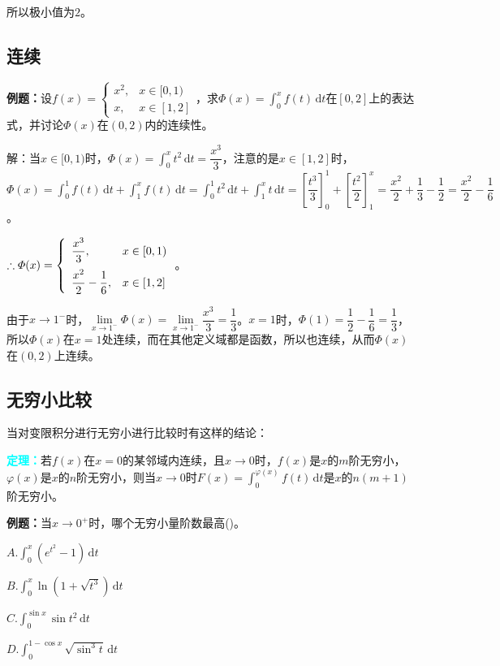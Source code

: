 \documentclass[UTF8, 12pt]{ctexart}
\begin{document}
所以极小值为$2$。

\subsection{连续}

\textbf{例题：}设$f(x)=\left\{\begin{array}{ll}
    x^2, & x\in[0,1) \\
    x, & x\in[1,2]
\end{array}\right.$，求$\varPhi(x)=\int_0^xf(t)\,\textrm{d}t$在$[0,2]$上的表达式，并讨论$\varPhi(x)$在$(0,2)$内的连续性。

解：当$x\in[0,1)$时，$\varPhi(x)=\int_0^xt^2\,\textrm{d}t=\dfrac{x^3}{3}$，注意的是$x\in[1,2]$时，$\varPhi(x)=\int_0^1f(t)\,\textrm{d}t+\int_1^xf(t)\,\textrm{d}t=\int_0^1t^2\,\textrm{d}t+\int_1^xt\,\textrm{d}t=\left[\dfrac{t^3}{3}\right]_0^1+\left[\dfrac{t^2}{2}\right]_1^x=\dfrac{x^2}{2}+\dfrac{1}{3}-\dfrac{1}{2}=\dfrac{x^2}{2}-\dfrac{1}{6}$。

$\therefore\varPhi(x)=\left\{\begin{array}{ll}
    \dfrac{x^3}{3}, & x\in[0,1) \medskip \\
    \dfrac{x^2}{2}-\dfrac{1}{6}, & x\in[1,2]
\end{array}\right.$。

由于$x\to1^-$时，$\lim\limits_{x\to1^-}\varPhi(x)=\lim\limits_{x\to1^-}\dfrac{x^3}{3}=\dfrac{1}{3}$。$x=1$时，$\varPhi(1)=\dfrac{1}{2}-\dfrac{1}{6}=\dfrac{1}{3}$，所以$\varPhi(x)$在$x=1$处连续，而在其他定义域都是函数，所以也连续，从而$\varPhi(x)$在$(0,2)$上连续。

\subsection{无穷小比较}

当对变限积分进行无穷小进行比较时有这样的结论：

\textcolor{aqua}{\textbf{定理：}}若$f(x)$在$x=0$的某邻域内连续，且$x\to0$时，$f(x)$是$x$的$m$阶无穷小，$\varphi(x)$是$x$的$n$阶无穷小，则当$x\to0$时$F(x)=\int_0^{\varphi(x)}f(t)\,\textrm{d}t$是$x$的$n(m+1)$阶无穷小。

\textbf{例题：}当$x\to0^+$时，哪个无穷小量阶数最高()。

$A.\int_0^x(e^{t^2}-1)\,\textrm{d}t$

$B.\int_0^x\ln(1+\sqrt{t^3})\,\textrm{d}t$

$C.\int_0^{\sin x}\sin t^2\,\textrm{d}t$

$D.\int_0^{1-\cos x}\sqrt{\sin^3t}\,\textrm{d}t$
\end{document}
